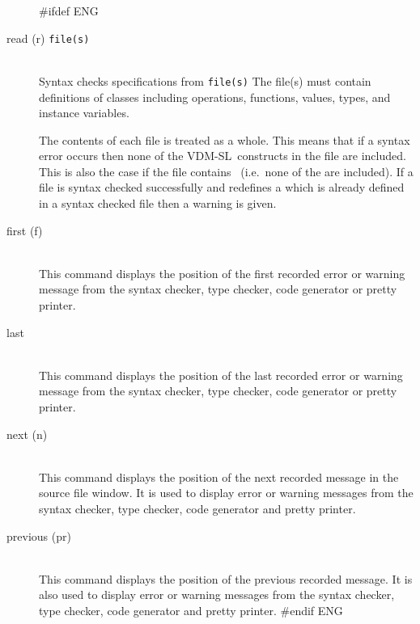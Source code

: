 \documentclass[\pformat,12pt]{article}
\newcommand{\vdmslpp}{VDM-SL}
\newcommand{\vdmslpp}{VDM++}
\begin{document}
\begin{description}
#ifdef ENG
\item[read (r) {\tt file(s)}] \mbox{}\\
  Syntax checks specifications from {\tt file(s)}
    {The file(s) must contain definitions of classes
    including operations, functions, values, types, and instance
    variables.}

  The contents of each file is treated as a whole.  This means that
  if a syntax error occurs then none of the \vdmslpp\ constructs in
  the file are included.  This is also the case if the file contains
  ~(i.e.~none of the
   are included).  If a
  file is syntax checked successfully and redefines a 
   which
  is already defined in a syntax checked file then a warning is
  given.

\item[first (f)] \mbox{}\\
  This command displays the position of the first recorded error or
  warning message from the syntax checker, type checker, code
  generator or pretty printer.

\item[last] \mbox{}\\
  This command displays the position of the last recorded error or
  warning message from the syntax checker, type checker, code
  generator or pretty printer.

\item[next (n) \index{next command}]\mbox{}\\
  This command displays the position of the next recorded message in
  the source file window.  It is used to display error or warning
  messages from the syntax checker, type checker, code generator and
  pretty printer.

\item[previous (pr)] \mbox{}\\
  This command displays the position of the previous recorded message.
  It is also used to display error or warning messages from the syntax
  checker, type checker, code generator and pretty printer.
#endif ENG


\end{description}
\end{document}
